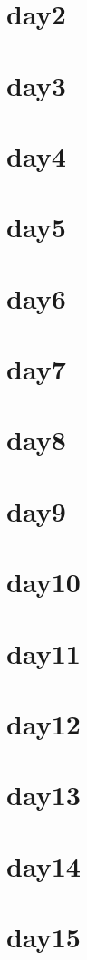 \documentclass[]{cpp}
\begin{document}
	\section{day2 }
    \newpage
	\section{day3 }
    \newpage
	\section{day4 }
    \newpage
	\section{day5 }
    \newpage
	\section{day6 }
    \newpage
	\section{day7 }
    \newpage
	\section{day8 }
    \newpage
	\section{day9 }
    \newpage
	\section{day10 }
    \newpage
	\section{day11 }
    \newpage
	\section{day12 }
    \newpage
	\section{day13 }
    \newpage
	\section{day14 }
    \newpage
	\section{day15 }
    \newpage
\end{document}
